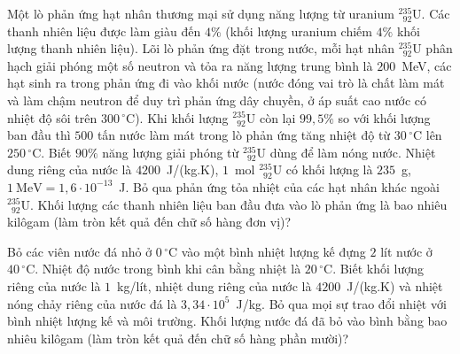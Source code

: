 	\begin{ex}%
		Một lò phản ứng hạt nhân thương mại sử dụng năng lượng từ uranium $^{235}_{\phantom{2}92}\text{U}$. Các thanh nhiên liệu được làm giàu đến $4\%$ (khối lượng uranium chiếm $4\%$ khối lượng thanh nhiên liệu). Lõi lò phản ứng đặt trong nước, mỗi hạt nhân $^{235}_{\phantom{2}92}\text{U}$ phân hạch giải phóng một số neutron và tỏa ra năng lượng trung bình là $200$~MeV, các hạt sinh ra trong phản ứng đi vào khối nước (nước đóng vai trò là chất làm mát và làm chậm neutron để duy trì phản ứng dây chuyền, ở áp suất cao nước có nhiệt độ sôi trên $300\,^\circ\text{C}$). Khi khối lượng $^{235}_{\phantom{2}92}\text{U}$ còn lại $99{,}5\%$ so với khối lượng ban đầu thì $500$ tấn nước làm mát trong lò phản ứng tăng nhiệt độ từ $30\,^\circ\text{C}$ lên $250\,^\circ\text{C}$. Biết $90\%$ năng lượng giải phóng từ $^{235}_{\phantom{2}92}\text{U}$ dùng để làm nóng nước. Nhiệt dung riêng của nước là $4200$~J/(kg.K), $1$~mol $^{235}_{\phantom{2}92}\text{U}$ có khối lượng là $235$~g, $1~\text{MeV}=1{,}6\cdot 10^{-13}$~J. Bỏ qua phản ứng tỏa nhiệt của các hạt nhân khác ngoài $^{235}_{\phantom{2}92}\text{U}$. Khối lượng các thanh nhiên liệu ban đầu đưa vào lò phản ứng là bao nhiêu kilôgam (làm tròn kết quả đến chữ số hàng đơn vị)?
		\par
	\end{ex}

	\begin{ex}%
		Bỏ các viên nước đá nhỏ ở $0\,^\circ\text{C}$ vào một bình nhiệt lượng kế đựng $2$ lít nước ở $40\,^\circ\text{C}$. Nhiệt độ nước trong bình khi cân bằng nhiệt là $20\,^\circ\text{C}$. Biết khối lượng riêng của nước là $1$~kg/lít, nhiệt dung riêng của nước là $4200$~J/(kg.K) và nhiệt nóng chảy riêng của nước đá là $3{,}34\cdot 10^5$~J/kg. Bỏ qua mọi sự trao đổi nhiệt với bình nhiệt lượng kế và môi trường. Khối lượng nước đá đã bỏ vào bình bằng bao nhiêu kilôgam (làm tròn kết quả đến chữ số hàng phần mười)?
		\par
	\end{ex}

